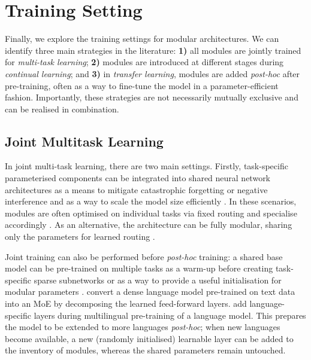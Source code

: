 \documentclass[10pt]{article} %
\begin{document}
\section{Training Setting} \label{sec:training_setting}

Finally, we explore the training settings for modular architectures. We can identify three main strategies in the literature: \textbf{1)} all modules are {jointly trained} for \textit{multi-task learning}; \textbf{2)} modules are introduced at different stages during \textit{continual learning}; and \textbf{3)} in \textit{transfer learning}, modules are added \textit{post-hoc} after pre-training, often as a way to fine-tune the model in a parameter-efficient fashion. Importantly, these strategies are not necessarily mutually exclusive and can be realised in combination. 

\subsection{Joint Multitask Learning}
\label{sec:training:pretraining}
 
In joint multi-task learning, there are two main settings. Firstly, task-specific parameterised components can be integrated into shared neural network architectures as a means to mitigate catastrophic forgetting or negative interference \citep{mccloskey1989catastrophicinterference, french1999catastrophic} and as a way to scale the model size efficiently \citep{kudugunta2021beyond}. In these scenarios, modules are often optimised on individual tasks via fixed routing and specialise accordingly \citep[][\textit{inter alia}; see \S~\ref{sec:routing:deterministic} for more details]{hampshire1992meta, rajendran2017adaapt}. 
As an alternative, the architecture can be fully modular, sharing only the parameters for learned routing \cite[][\textit{inter alia}; see \S~\ref{sec:routing:softlearnedrouting} for more details]{jacobs1991adaptive, jacobs1991task,rosenbaum2017routing,kirsch2018modular,chang2018automatically}.  

Joint training can also be performed before \textit{post-hoc} training: a shared base model can be pre-trained on multiple tasks as a warm-up before creating task-specific sparse subnetworks \citep{sun2020learning} or as a way to 
provide a useful initialisation for modular parameters \citep{Vu2022spot}. \citet{dua-etal-2022-tricks} convert a dense language model pre-trained on text data into an MoE by decomposing the learned feed-forward layers.
\cite{Pfeiffer2022Lifting} add language-specific layers during multilingual pre-training of a language model. This prepares the model to be extended to more languages \textit{post-hoc}; when new languages become available, a new (randomly initialised) learnable layer can be added to the inventory of modules, whereas the shared parameters remain untouched.
 
\end{document}
